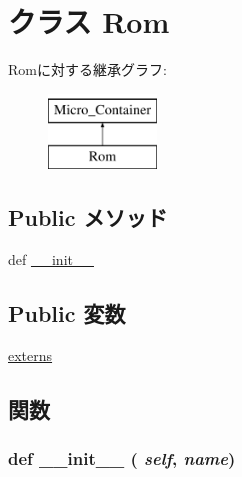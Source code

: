 \hypertarget{classmicro__asm_1_1Rom}{
\section{クラス Rom}
\label{classmicro__asm_1_1Rom}
}
Romに対する継承グラフ:\begin{figure}[H]
\begin{center}
\leavevmode
\includegraphics[height=2cm]{classmicro__asm_1_1Rom}
\end{center}
\end{figure}
\subsection*{Public メソッド}
\begin{DoxyCompactItemize}
\item 
def \hyperlink{classmicro__asm_1_1Rom_ac775ee34451fdfa742b318538164070e}{\_\-\_\-init\_\-\_\-}
\end{DoxyCompactItemize}
\subsection*{Public 変数}
\begin{DoxyCompactItemize}
\item 
\hyperlink{classmicro__asm_1_1Rom_a60da89404fb9e6497fca0a251b534823}{externs}
\end{DoxyCompactItemize}


\subsection{関数}
\hypertarget{classmicro__asm_1_1Rom_ac775ee34451fdfa742b318538164070e}{
\subsubsection[{\_\-\_\-init\_\-\_\-}]{\setlength{\rightskip}{0pt plus 5cm}def \_\-\_\-init\_\-\_\- ( {\em self}, \/   {\em name})}}
\label{classmicro__asm_1_1Rom_ac775ee34451fdfa742b318538164070e}


